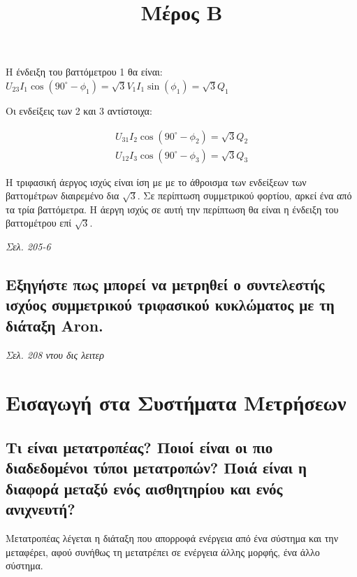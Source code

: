 \documentclass{article}
\begin{document}
Η ένδειξη του βαττόμετρου 1 θα είναι: $U_{23}I_1\cos(90^\circ - \phi_1) = \sqrt{3}V_1I_1\sin(\phi_1) = \sqrt{3}Q_1$
\newpage

Οι ενδείξεις των 2 και 3 αντίστοιχα:

\begin{align*}
    U_{31}I_2\cos(90^\circ - \phi_2)=\sqrt3Q_2 \\
    U_{12}I_3\cos(90^\circ - \phi_3)=\sqrt3Q_3
\end{align*}

Η τριφασική άεργος ισχύς είναι ίση με με το άθροισμα των ενδείξεων των βαττομέτρων διαιρεμένο δια $\sqrt{3}$. Σε περίπτωση συμμετρικού φορτίου, αρκεί ένα από τα τρία βαττόμετρα. Η άεργη ισχύς σε αυτή την περίπτωση θα είναι η ένδειξη του βαττομέτρου επί $\sqrt{3}$.

\emph{Σελ. 205-6}
\subsection{Εξηγήστε πως μπορεί να μετρηθεί ο συντελεστής ισχύος συμμετρικού τριφασικού κυκλώματος με τη διάταξη \foreignlanguage{english}{Aron}.}
\emph{Σελ. 208 ντου δις λειτερ}


\title{Μέρος Β}

\maketitle

\section{Εισαγωγή στα Συστήματα Μετρήσεων}
\subsection{Τι είναι μετατροπέας? Ποιοί είναι οι πιο διαδεδομένοι τύποι μετατροπών? Ποιά είναι η διαφορά μεταξύ ενός αισθητηρίου και ενός ανιχνευτή?}
Μετατροπέας λέγεται η διάταξη που απορροφά ενέργεια από ένα σύστημα και την μεταφέρει, αφού συνήθως τη μετατρέπει σε ενέργεια άλλης μορφής, ένα άλλο σύστημα.
\end{document}

